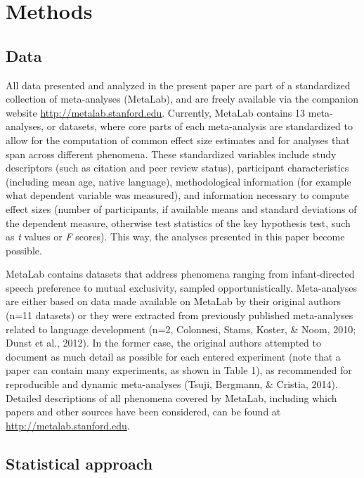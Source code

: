 \documentclass[english,floatsintext,man]{apa6}
\newcounter{author}
\begin{document}
\section{Methods}\label{methods}

\subsection{Data}\label{data}

All data presented and analyzed in the present paper are part of a
standardized collection of meta-analyses (MetaLab), and are freely
available via the companion website \url{http://metalab.stanford.edu}.
Currently, MetaLab contains 13 meta-analyses, or datasets, where core
parts of each meta-analysis are standardized to allow for the
computation of common effect size estimates and for analyses that span
across different phenomena. These standardized variables include study
descriptors (such as citation and peer review status), participant
characteristics (including mean age, native language), methodological
information (for example what dependent variable was measured), and
information necessary to compute effect sizes (number of participants,
if available means and standard deviations of the dependent measure,
otherwise test statistics of the key hypothesis test, such as \emph{t}
values or \emph{F} scores). This way, the analyses presented in this
paper become possible.

MetaLab contains datasets that address phenomena ranging from
infant-directed speech preference to mutual exclusivity, sampled
opportunistically. Meta-analyses are either based on data made available
on MetaLab by their original authors (n=11 datasets) or they were
extracted from previously published meta-analyses related to language
development (n=2, Colonnesi, Stams, Koster, \& Noom, 2010; Dunst et al.,
2012). In the former case, the original authors attempted to document as
much detail as possible for each entered experiment (note that a paper
can contain many experiments, as shown in Table 1), as recommended for
reproducible and dynamic meta-analyses (Tsuji, Bergmann, \& Cristia,
2014). Detailed descriptions of all phenomena covered by MetaLab,
including which papers and other sources have been considered, can be
found at \url{http://metalab.stanford.edu}.

\subsection{Statistical approach}\label{statistical-approach}
\end{document}
